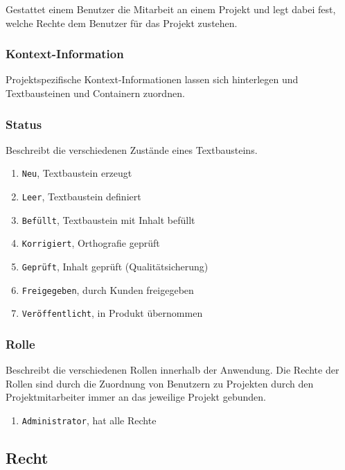 Gestattet einem Benutzer die Mitarbeit an einem Projekt und legt dabei fest, welche Rechte dem Benutzer für das Projekt zustehen.

\subsubsection{Kontext-Information}\label{model:contextinfo}

Projektspezifische Kontext-Informationen lassen sich hinterlegen und Textbausteinen und Containern zuordnen.

\subsubsection{Status}\label{model:status}

Beschreibt die verschiedenen Zustände eines Textbausteins.

\begin{enumerate}\itemsep -5pt
\item \texttt{Neu}, Textbaustein erzeugt
\item \texttt{Leer}, Textbaustein definiert
\item \texttt{Befüllt}, Textbaustein mit Inhalt befüllt
\item \texttt{Korrigiert}, Orthografie geprüft
\item \texttt{Geprüft}, Inhalt geprüft (Qualitätsicherung)
\item \texttt{Freigegeben}, durch Kunden freigegeben
\item \texttt{Veröffentlicht}, in Produkt übernommen
\end{enumerate}

\subsubsection{Rolle}\label{model:rolle}

Beschreibt die verschiedenen Rollen innerhalb der Anwendung. Die Rechte der Rollen sind durch die Zuordnung von Benutzern zu Projekten durch den Projektmitarbeiter immer an das jeweilige Projekt gebunden.

\begin{enumerate}\itemsep -5pt
\item \texttt{Administrator}, hat alle Rechte 
\end{enumerate}

\subsection{Recht}\label{model:recht}

